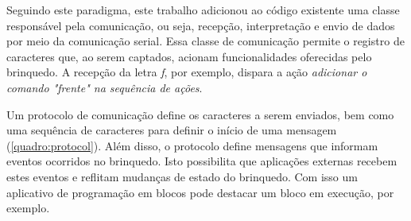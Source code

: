 Seguindo este paradigma, este trabalho adicionou ao código existente uma classe responsável pela comunicação, ou seja, recepção, interpretação e envio de dados por meio da comunicação serial. Essa classe de comunicação permite o registro de caracteres que, ao serem captados, acionam funcionalidades oferecidas pelo brinquedo. A recepção da letra \textit{f}, por exemplo, dispara a ação \textit{adicionar o comando "frente" na sequência de ações}.

Um protocolo de comunicação define os caracteres a serem enviados, bem como uma sequência de caracteres para definir o início de uma mensagem (\autoref{quadro:protocol}). Além disso, o protocolo define mensagens que informam eventos ocorridos no brinquedo. Isto possibilita que aplicações externas recebem estes eventos e reflitam mudanças de estado do brinquedo. Com isso um aplicativo de programação em blocos pode destacar um bloco em execução, por exemplo.
